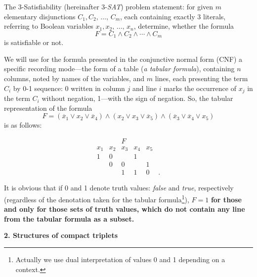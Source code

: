 \documentclass[12pt, a4paper]{article}
\begin{document}
The 3-Satisfiability (hereinafter 3-{\it SAT}) problem statement: for given  $m$  elementary disjunctions $C_1, C_2, \,\dots,\, C_m$, each containing exactly 3 literals, referring to Boolean variables $x_1, x_2, \,\dots,\, x_n$, determine, whether the formula $$F=C_1\wedge C_2\wedge \cdots \wedge C_m$$  is satisfiable or not.

We will use for the formula presented in the conjunctive normal form (CNF) a specific recording mode---the form of a table ({\it a tabular formula}), containing $n$ columns, noted by names of the variables, and  $m$ lines, each presenting the term $C_i$ by 0-1 sequence: 0  written in column  $j$  and line  $i$  marks the occurrence of $x_j$   in the term $C_i$ without negation, 1---with the sign of negation.
So, the tabular representation of the formula
$$
F=(\overline{x}_1 \vee x_2 \vee \overline{x}_4)\wedge
(x_2 \vee x_3 \vee \overline{x}_5)\wedge
(\overline{x}_3 \vee \overline{x}_4 \vee x_5)
$$ is as follows:

$$
\begin{array}{ccccccc}
&&F\\
x_1& x_2& x_3& x_4& x_5\\[3pt]
1&0&&1&\\
&0&0&&1&\\
&&1&1&0&.
\end{array}
$$

It is obvious that if 0 and 1 denote truth values: {\it false} and {\it true}, respectively (regardless of the denotation taken for the tabular formula\footnote{Actually we use dual interpretation of values 0 and 1 depending on a context.}), $F = 1$ {\bf for those and only for those sets of truth values, which do not contain any line from the tabular formula as a subset.}

\medskip
\textbf{2. Structures of compact triplets}
\end{document}
